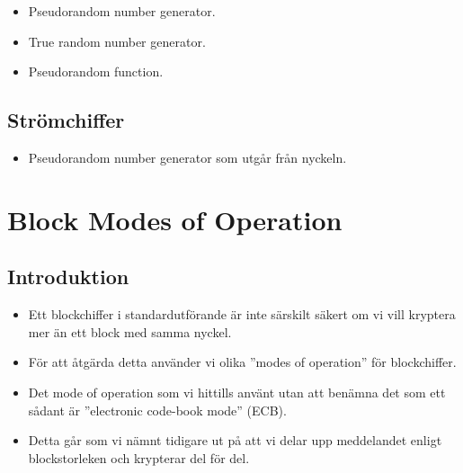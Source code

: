 \documentclass{beamer}
\theoremstyle{definition}
\begin{document}
\begin{frame}{\insertsubsectionhead}
  \begin{itemize}
    \item Pseudorandom number generator.
    \item True random number generator.
    \item Pseudorandom function.
  \end{itemize}
\end{frame}

\subsection{Strömchiffer}

\begin{frame}{\insertsubsectionhead}
  \begin{itemize}
    \item Pseudorandom number generator som utgår från nyckeln.
  \end{itemize}
\end{frame}


\section{Block Modes of Operation}

\subsection{Introduktion}

\begin{frame}{\insertsubsectionhead}
  \begin{itemize}
    \item Ett blockchiffer i standardutförande är inte särskilt säkert om vi 
      vill kryptera mer än ett block med samma nyckel.

    \item För att åtgärda detta använder vi olika 
      ''\foreignlanguage{english}{modes of operation}'' för blockchiffer.

  \end{itemize}
\end{frame}

\begin{frame}{\insertsubsectionhead}
  \begin{itemize}
    \item Det mode of operation som vi hittills använt utan att benämna det som 
      ett sådant är ''\foreignlanguage{english}{electronic code-book mode}'' 
      (ECB).

    \item Detta går som vi nämnt tidigare ut på att vi delar upp meddelandet 
      enligt blockstorleken och krypterar del för del.

  \end{itemize}
\end{frame}
\end{document}
